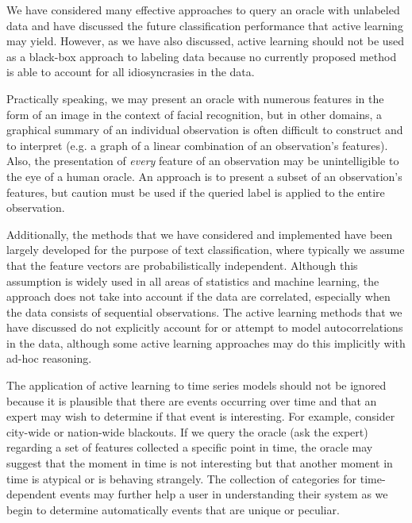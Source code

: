 \documentclass[article]{jss}
\begin{document}

We have considered many effective approaches to query an oracle with unlabeled data and have discussed the future classification performance that active learning may yield. However, as we have also discussed, active learning should not be used as a black-box approach to labeling data because no currently proposed method is able to account for all idiosyncrasies in the data.


Practically speaking, we may present an oracle with numerous features in the form of an image in the context of facial recognition, but in other domains, a graphical summary of an individual observation is often difficult to construct and to interpret (e.g. a graph of a linear combination of an observation's features). Also, the presentation of \emph{every} feature of an observation may be unintelligible to the eye of a human oracle. An approach is to present a subset of an observation's features, but caution must be used if the queried label is applied to the entire observation.

Additionally, the methods that we have considered and implemented have been largely developed for the purpose of text classification, where typically we assume that the feature vectors are probabilistically independent. Although this assumption is widely used in all areas of statistics and machine learning, the approach does not take into account if the data are correlated, especially when the data consists of sequential observations. The active learning methods that we have discussed do not explicitly account for or attempt to model autocorrelations in the data, although some active learning approaches may do this implicitly with ad-hoc reasoning.

The application of active learning to time series models should not be ignored because it is plausible that there are events occurring over time and that an expert may wish to determine if that event is interesting. For example, consider city-wide or nation-wide blackouts. If we query the oracle (ask the expert) regarding a set of features collected a specific point in time, the oracle may suggest that the moment in time is not interesting but that another moment in time is atypical or is behaving strangely. The collection of categories for time-dependent events may further help a user in understanding their system as we begin to determine automatically events that are unique or peculiar.
\end{document}
